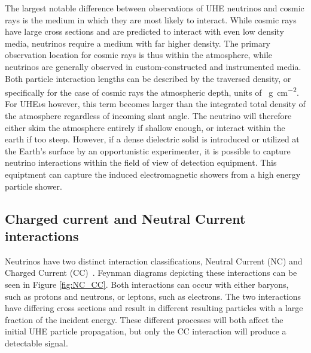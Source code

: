 	The largest notable difference between observations of UHE neutrinos and cosmic rays is the medium in which they are most likely to interact.  While cosmic rays have large cross sections and are predicted to interact with even low density media, neutrinos require a medium with far higher density.  The primary observation location for cosmic rays is thus within the atmosphere, while neutrinos are generally observed in custom-constructed and instrumented media.  Both particle interaction lengths can be described by the traversed density, or specifically for the case of cosmic rays the atmospheric depth, units of \SI{}{\gram\per\square\centi\meter}.  For UHE$\nu$s however, this term becomes larger than the integrated total density of the atmosphere regardless of incoming slant angle.  The neutrino will therefore either skim the atmosphere entirely if shallow enough, or interact within the earth if too steep.  However, if a dense dielectric solid is introduced or utilized at the Earth's surface by an opportunistic experimenter, it is possible to capture neutrino interactions within the field of view of detection equipment.  This equiptment can capture the induced electromagnetic showers from a high energy particle shower.
	
	\subsection{Charged current and Neutral Current interactions} 
		Neutrinos have two distinct interaction classifications, Neutral Current (NC) and Charged Current (CC)~\cite{neutrinoCrossSectionMeasurements}.  Feynman diagrams depicting these interactions can be seen in Figure \ref{fig:NC_CC}.  Both interactions can occur with either baryons, such as protons and neutrons, or leptons, such as electrons.  The two interactions have differing cross sections and result in different resulting particles with a large fraction of the incident energy.  These different processes will both affect the initial UHE particle propagation, but only the CC interaction will produce a detectable signal.
	
